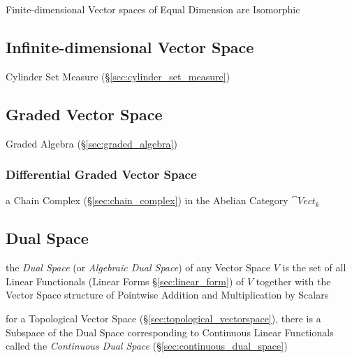 Finite-dimensional Vector spaces of Equal Dimension are Isomorphic



\subsection{Infinite-dimensional Vector Space}
\label{sec:infinite_dimensional_vectorspace}

Cylinder Set Measure (\S\ref{sec:cylinder_set_measure})



\subsection{Graded Vector Space}\label{sec:graded_vectorspace}

Graded Algebra (\S\ref{sec:graded_algebra})



\subsubsection{Differential Graded Vector Space}\label{sec:differential_graded}

a Chain Complex (\S\ref{sec:chain_complex}) in the Abelian Category
$\cat{Vect}_k$



\subsection{Dual Space}\label{sec:dual_space}

the \emph{Dual Space} (or \emph{Algebraic Dual Space}) of any Vector Space $V$
is the set of all Linear Functionals (Linear Forms \S\ref{sec:linear_form}) of
$V$ together with the Vector Space structure of Pointwise Addition and
Multiplication by Scalars

for a Topological Vector Space (\S\ref{sec:topological_vectorspace}), there is
a Subspace of the Dual Space corresponding to Continuous Linear Functionals
called the \emph{Continuous Dual Space} (\S\ref{sec:continuous_dual_space})

